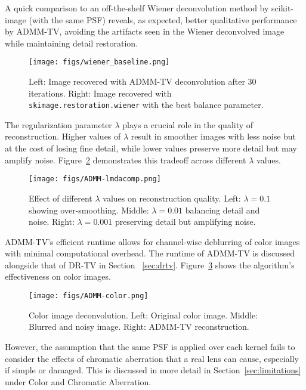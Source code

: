\documentclass[sigconf]{acmart}
\begin{document}
A quick comparison to an off-the-shelf Wiener deconvolution method by scikit-image (with the same PSF) reveals, as expected, better qualitative performance by ADMM-TV, avoiding the artifacts seen in the Wiener deconvolved image while maintaining detail restoration.
\begin{figure}[h]
  \centering
  \texttt{[image: figs/wiener\_baseline.png]}
  \caption{Left: Image recovered with ADMM-TV deconvolution after 30 iterations. Right: Image recovered with \texttt{skimage.restoration.wiener} with the best balance parameter.}
  \label{fig:admm-wiener}
\end{figure}


The regularization parameter $\lambda$ plays a crucial role in the quality of reconstruction. Higher values of $\lambda$ result in smoother images with less noise but at the cost of losing fine detail, while lower values preserve more detail but may amplify noise. Figure~\ref{fig:lambda-comp} demonstrates this tradeoff across different $\lambda$ values.

\begin{figure}[h]
  \centering
  \texttt{[image: figs/ADMM-lmdacomp.png]}
  \caption{Effect of different $\lambda$ values on reconstruction quality. Left: $\lambda=0.1$ showing over-smoothing. Middle: $\lambda=0.01$ balancing detail and noise. Right: $\lambda=0.001$ preserving detail but amplifying noise.}
  \label{fig:lambda-comp}
\end{figure}

ADMM-TV's efficient runtime allows for channel-wise deblurring of color images with minimal computational overhead. The runtime of ADMM-TV is discussed alongside that of DR-TV in Section ~\ref{sec:drtv}. Figure~\ref{fig:color-admm} shows the algorithm's effectiveness on color images.

\begin{figure}[h]
  \centering
  \texttt{[image: figs/ADMM-color.png]}
  \caption{Color image deconvolution. Left: Original color image. Middle: Blurred and noisy image. Right: ADMM-TV reconstruction.}
  \label{fig:color-admm}
\end{figure}

However, the assumption that the same PSF is applied over each kernel fails to consider the effects of chromatic aberration that a real lens can cause, especially if simple or damaged. This is discussed in more detail in Section~\ref{sec:limitations} under Color and Chromatic Aberration.
\end{document}
